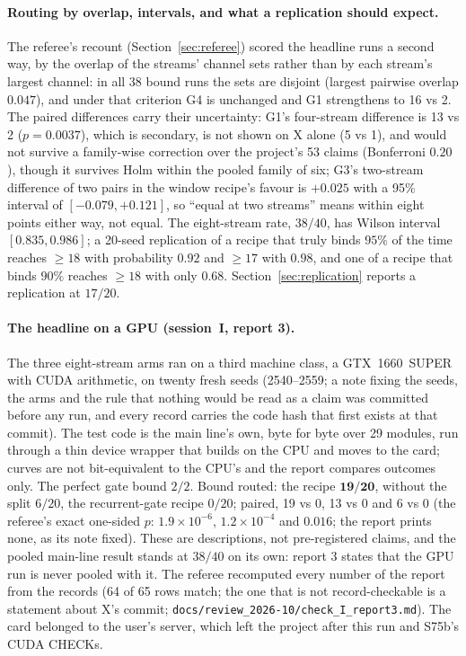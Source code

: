 \documentclass[11pt]{article}
\begin{document}
\paragraph{Routing by overlap, intervals, and what a replication should expect.} The referee's recount (Section~\ref{sec:referee}) scored the headline runs a second way, by the overlap of the streams' channel sets rather than by each stream's largest channel: in all 38 bound runs the sets are disjoint (largest pairwise overlap $0.047$), and under that criterion G4 is unchanged and G1 strengthens to 16 vs 2. The paired differences carry their uncertainty: G1's four-stream difference is 13 vs 2 ($p = 0.0037$), which is secondary, is not shown on X alone (5 vs 1), and would not survive a family-wise correction over the project's 53 claims (Bonferroni $0.20$), though it survives Holm within the pooled family of six; G3's two-stream difference of two pairs in the window recipe's favour is $+0.025$ with a 95\% interval of $[-0.079, +0.121]$, so ``equal at two streams'' means within eight points either way, not equal. The eight-stream rate, $38/40$, has Wilson interval $[0.835, 0.986]$; a 20-seed replication of a recipe that truly binds $95\%$ of the time reaches $\geq 18$ with probability $0.92$ and $\geq 17$ with $0.98$, and one of a recipe that binds $90\%$ reaches $\geq 18$ with only $0.68$. Section~\ref{sec:replication} reports a replication at $17/20$.

\paragraph{The headline on a GPU (session~I, report 3).} The three eight-stream arms ran on a third machine class, a GTX~1660~SUPER with CUDA arithmetic, on twenty fresh seeds (2540--2559; a note fixing the seeds, the arms and the rule that nothing would be read as a claim was committed before any run, and every record carries the code hash that first exists at that commit). The test code is the main line's own, byte for byte over 29 modules, run through a thin device wrapper that builds on the CPU and moves to the card; curves are not bit-equivalent to the CPU's and the report compares outcomes only. The perfect gate bound $2/2$. Bound routed: the recipe $\mathbf{19/20}$, without the split $6/20$, the recurrent-gate recipe $0/20$; paired, 19 vs 0, 13 vs 0 and 6 vs 0 (the referee's exact one-sided $p$: $1.9\times10^{-6}$, $1.2\times10^{-4}$ and $0.016$; the report prints none, as its note fixed). These are descriptions, not pre-registered claims, and the pooled main-line result stands at $38/40$ on its own: report 3 states that the GPU run is never pooled with it. The referee recomputed every number of the report from the records (64 of 65 rows match; the one that is not record-checkable is a statement about X's commit; \texttt{docs/review\_2026-10/check\_I\_report3.md}). The card belonged to the user's server, which left the project after this run and S75b's CUDA CHECKs.
\end{document}
